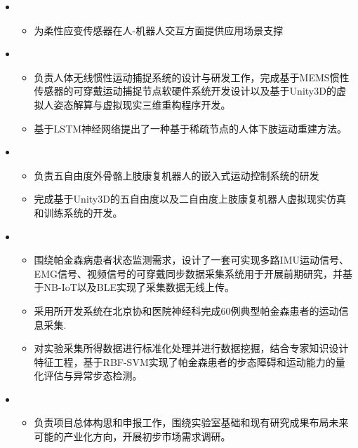 \begin{itemize}[leftmargin=*]
    \item {}
    {\small
    \begin{itemize}
      \item 为柔性应变传感器在人-机器人交互方面提供应用场景支撑
    \end{itemize}
    }
    \item {}
    {\small
    \begin{itemize}
      \item 负责人体无线惯性运动捕捉系统的设计与研发工作，完成基于MEMS惯性传感器的可穿戴运动捕捉节点软硬件系统开发设计以及基于Unity3D的虚拟人姿态解算与虚拟现实三维重构程序开发。
      \item 基于LSTM神经网络提出了一种基于稀疏节点的人体下肢运动重建方法。
    \end{itemize}
    }
    \item {}
    {\small
    \begin{itemize}
      \item 负责五自由度外骨骼上肢康复机器人的嵌入式运动控制系统的研发
      \item 完成基于Unity3D的五自由度以及二自由度上肢康复机器人虚拟现实仿真和训练系统的开发。
    \end{itemize}
    }
    \item {}
    {\small
    \begin{itemize}
      \item 围绕帕金森病患者状态监测需求，设计了一套可实现多路IMU运动信号、EMG信号、视频信号的可穿戴同步数据采集系统用于开展前期研究，并基于NB-IoT以及BLE实现了采集数据无线上传。
      \item 采用所开发系统在北京协和医院神经科完成60例典型帕金森患者的运动信息采集.
      \item 对实验采集所得数据进行标准化处理并进行数据挖掘，结合专家知识设计特征工程，基于RBF-SVM实现了帕金森患者的步态障碍和运动能力的量化评估与异常步态检测。
    \end{itemize}
    }
    \item {}
    {\small
    \begin{itemize}
      \item 负责项目总体构思和申报工作，围绕实验室基础和现有研究成果布局未来可能的产业化方向，开展初步市场需求调研。
    \end{itemize}
    }
  \end{itemize}